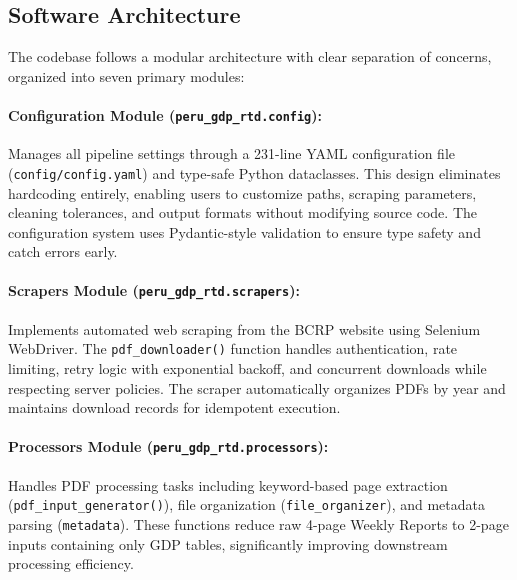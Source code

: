 \documentclass[a4paper, fleqn, 11pt]{article}
\newcommand{\pymodule}[1]{\texttt{#1}}
\newcommand{\pyfunction}[1]{\texttt{#1()}}
\newcommand{\filepath}[1]{\texttt{#1}}
\begin{document}
\subsection{Software Architecture}

The codebase follows a modular architecture with clear separation of concerns, organized into seven primary modules:

\paragraph{Configuration Module (\pymodule{peru\_gdp\_rtd.config}):} Manages all pipeline settings through a 231-line YAML configuration file (\filepath{config/config.yaml}) and type-safe Python dataclasses. This design eliminates hardcoding entirely, enabling users to customize paths, scraping parameters, cleaning tolerances, and output formats without modifying source code. The configuration system uses Pydantic-style validation to ensure type safety and catch errors early.

\paragraph{Scrapers Module (\pymodule{peru\_gdp\_rtd.scrapers}):} Implements automated web scraping from the BCRP website using Selenium WebDriver. The \pyfunction{pdf\_downloader} function handles authentication, rate limiting, retry logic with exponential backoff, and concurrent downloads while respecting server policies. The scraper automatically organizes PDFs by year and maintains download records for idempotent execution.

\paragraph{Processors Module (\pymodule{peru\_gdp\_rtd.processors}):} Handles PDF processing tasks including keyword-based page extraction (\pyfunction{pdf\_input\_generator}), file organization (\pymodule{file\_organizer}), and metadata parsing (\pymodule{metadata}). These functions reduce raw 4-page Weekly Reports to 2-page inputs containing only GDP tables, significantly improving downstream processing efficiency.
\end{document}
